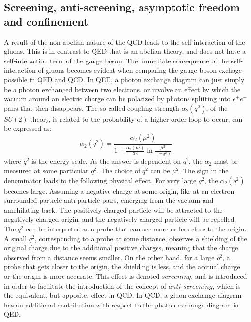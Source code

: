 \subsection*{Screening, anti-screening, asymptotic freedom and confinement} 
\noindent\justify
A result of the non-abelian nature of the QCD leads to the self-interaction of the gluons.
This is in contrast to QED that is an abelian theory, and does not have a self-interaction term of the gauge boson. 
The immediate consequence of the self-interaction of gluons becomes evident when comparing the gauge boson exchage possible in QED and QCD. 
In QED, a photon exchange diagram can just simply be a photon exchanged between two electrons, or involve an effect by which the vacuum around an electric charge can be polarized by photons splitting into $e^{+}e^{-}$ pairs that then disappears. 
The so-called coupling strength $\alpha_{2}(q^{2})$, of the $SU(2)$ theory, is related to the probability of a higher order loop to occur, can be expressed as:  
\begin{equation}
\alpha_{2}(q^{2})=\frac{\alpha_{2}(\mu^{2})}{1+\frac{\alpha_{2}(\mu^{2})}{3\pi}\ln\frac{\mu^{2}}{(-q^{2})}}
\label{eq:QEDalpha}
\end{equation}
where $q^{2}$ is the energy scale. 
As the answer is dependent on $q^{2}$, the $\alpha_{2}$ must be measured at some particular $q^{2}$. The choice of $q^{2}$ can be $\mu^{2}$.
The sign in the denominator leads to the following physical effect. 
For very large $q^{2}$, the $\alpha_{2}(q^{2})$ becomes large. 
Assuming a negative charge at some origin, like at an electron, surrounded particle anti-particle pairs, emerging from the vacuum and annihilating back. 
The positively charged particle will be attracted to the negatively charged origin, and the negatively charged particle will be repelled.   
The $q^{2}$ can be interpreted as a probe that can see more or less close to the origin. 
A small $q^{2}$, corresponding to a probe at some distance, observes a shielding of the original charge due to the additional positive charges, meaning that the charge observed from a distance seems smaller. 
On the other hand, for a large $q^{2}$, a probe that gets closer to the origin, the shielding is less, and the acctual charge or the origin is more accurate. 
This effect is denoted $screening$, and is introduced in order to facilitate the introduction of the concept of $anti$-$screening$, which is the equivalent, but opposite, effect in QCD.
\newpara
\noindent\justify
In QCD, a gluon exchange diagram has an additional contribution with respect to the photon exchange diagram in QED. 

